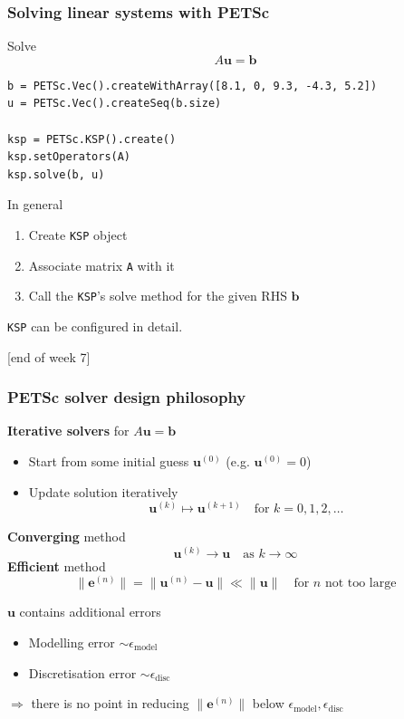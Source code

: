 \documentclass{beamer}
\begin{document}
\begin{frame}[fragile]
  \frametitle{Solving linear systems with PETSc}
 Solve 
 $$A\boldsymbol{u}=\boldsymbol{b}$$
\begin{lstlisting}
b = PETSc.Vec().createWithArray([8.1, 0, 9.3, -4.3, 5.2])
u = PETSc.Vec().createSeq(b.size)

ksp = PETSc.KSP().create()
ksp.setOperators(A)
ksp.solve(b, u)
\end{lstlisting}
In general
 \begin{enumerate}
 \item Create \lstinline{KSP} object
 \item Associate matrix \lstinline{A} with it 
 \item Call the \lstinline{KSP}'s solve method for the given RHS $\boldsymbol{b}$
 \end{enumerate}
\lstinline{KSP} can be configured in detail.
{\begin{flushright} {\footnotesize [end of week 7]} \end{flushright}}
\end{frame}


\begin{frame}
  \frametitle{PETSc solver design philosophy}
  \textbf{Iterative solvers} for $A\boldsymbol{u}=\boldsymbol{b}$
  \begin{itemize}
    \item Start from some initial guess $\boldsymbol{u}^{(0)}$ (e.g. $\boldsymbol{u}^{(0)}=0$)
    \item Update solution iteratively
    $$
    \boldsymbol{u}^{(k)}\mapsto \boldsymbol{u}^{(k+1)}
    \quad\text{for $k=0,1,2,\dots$}
    $$
  \end{itemize} 
  \textbf{Converging} method
  $$
  \boldsymbol{u}^{(k)} \rightarrow \boldsymbol{u} \quad\text{as $k\rightarrow \infty$}
  $$
  \textbf{Efficient} method
  $$
  \|\boldsymbol{e}^{(n)}\| = \|\boldsymbol{u}^{(n)}-\boldsymbol{u}\|\ll \|\boldsymbol{u}\| \quad\text{for $n$ not too large}
  $$
  \begin{minipage}{0.5\linewidth}
  $\boldsymbol{u}$ contains additional errors
  \begin{itemize}
  \item Modelling error $\sim \epsilon_{\text{model}}$
  \item Discretisation error $\sim \epsilon_{\text{disc}}$
  \end{itemize}
\end{minipage}
\hfill
\begin{minipage}{0.45\linewidth}
  $\Rightarrow$ there is no point in reducing $\|\boldsymbol{e}^{(n)}\|$ below $\epsilon_{\text{model}},\epsilon_{\text{disc}}$
\end{minipage}
\end{frame}
\end{document}
